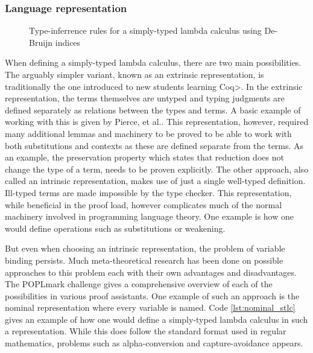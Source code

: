 \subsubsection{Language representation}
\label{sec:language_repr}

\begin{figure}
  \label{fig:stlc_infer}
  \caption{Type-inferrence rules for a simply-typed lambda calculus using De-Bruijn indices}
\end{figure}

When defining a simply-typed lambda calculus, there are two main possibilities\cite{plfa2019}.
The arguably simpler variant, known as an extrinsic representation, is traditionally the one introduced to new students learning \<Coq>.
In the extrinsic representation, the terms themselves are untyped and typing judgments are defined separately as relations between the types and terms.
A basic example of working with this is given by Pierce, et al.\cite{Pierce:SF2}.
This representation, however, required many additional lemmas and machinery to be proved to be able to work with both substitutions and contexts as these are defined separate from the terms.
As an example, the preservation property which states that reduction does not change the type of a term, needs to be proven explicitly.
The other approach, also called an intrinsic representation, makes use of just a single well-typed definition.
Ill-typed terms are made impossible by the type checker.
This representation, while beneficial in the proof load, however complicates much of the normal machinery involved in programming language theory.
One example is how one would define operations such as substitutions or weakening.

But even when choosing an intrinsic representation, the problem of variable binding persists.
Much meta-theoretical research has been done on possible approaches to this problem each with their own advantages and disadvantages.
The POPLmark challenge gives a comprehensive overview of each of the possibilities in various proof assistants\cite{Aydemir2005}.
One example of such an approach is the nominal representation where every variable is named.
Code \cref{lst:nominal_stlc} gives an example of how one would define a simply-typed lambda calculus in such a representation.
While this does follow the standard format used in regular mathematics, problems such as alpha-conversion and capture-avoidance appears.

